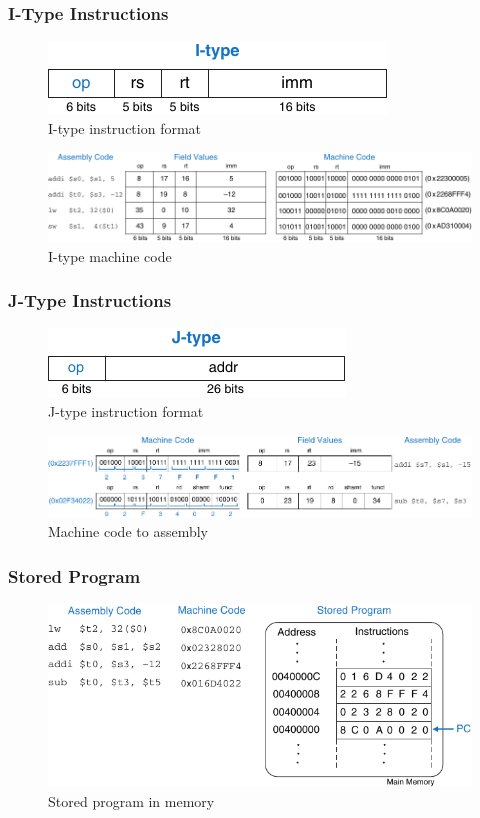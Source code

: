 \documentclass[xcolor={table, dvipsnames}]{beamer}
\begin{document}
\begin{frame}
\frametitle{I-Type Instructions}
 \begin{figure}
 \includegraphics{img/i-type-instruction.pdf}
 \caption{I-type instruction format}
 \end{figure}
   \begin{figure}
 \includegraphics[scale=0.8]{img/i-type-machine-code.pdf}
 \caption{I-type machine code}
 \end{figure}
\end{frame}

\begin{frame}
\frametitle{J-Type Instructions}
 \begin{figure}
 \includegraphics{img/j-type-instruction.pdf}
 \caption{J-type instruction format}
 \end{figure}
 \begin{figure}
 \includegraphics[scale=0.8]{img/machine-to-assembly.pdf}
 \caption{Machine code to assembly}
 \end{figure}
\end{frame}

\begin{frame}
\frametitle{Stored  Program}
\begin{figure}
 \includegraphics{img/stored-program.pdf}
 \caption{Stored program in memory}
 \end{figure}
\end{frame}
\end{document}

